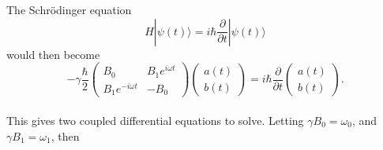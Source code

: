 The Schr\"{o}dinger equation
\begin{equation}
H|\psi(t) \rangle = i\hbar\frac{\partial}{\partial t}|\psi(t) \rangle
\end{equation}
would then become        
\begin{equation}
-\gamma \frac{\hbar}{2}\begin{pmatrix} B_{0} & B_{1}e^{i\omega t} \\ B_{1}e^{-i\omega t} & -B_{0} \end{pmatrix} \begin{pmatrix} a(t) \\ b(t) \end{pmatrix} = i\hbar\frac{\partial}{\partial t} \begin{pmatrix} a(t) \\ b(t) \end{pmatrix}.
\end{equation} 
\\
This gives two coupled differential equations to solve.  Letting
$\gamma B_{0} = \omega_{0}$, and $\gamma B_{1} = \omega_{1}$, then

